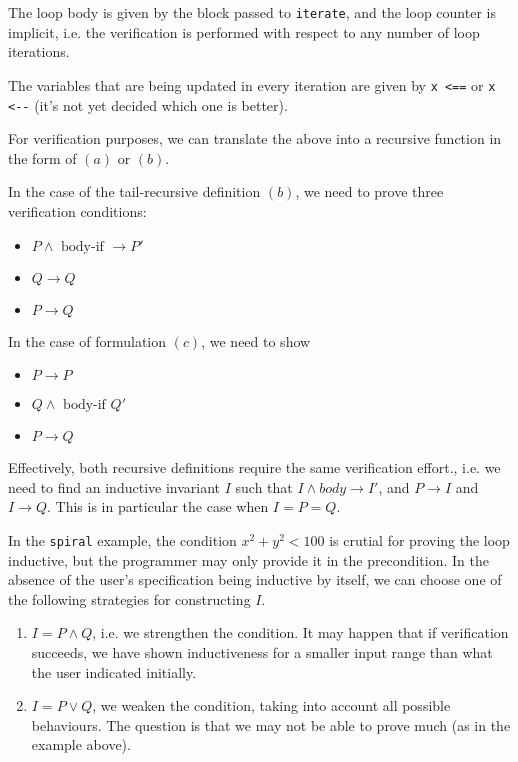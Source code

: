 The loop body is given by the block passed to \lstinline{iterate},
and the loop counter is implicit, i.e. the verification is performed
with respect to any number of loop iterations.

The variables that are being updated in every iteration are given by
\lstinline{x <==} or \lstinline{x <--} (it's not yet decided which one is better).

For verification purposes, we can translate the above into a recursive function
in the form of $(a)$ or $(b)$.

In the case of the tail-recursive definition $(b)$, we need to prove three verification
conditions:
\begin{itemize}
\item $P \wedge \text{ body-if } \to P'$

\item $Q \to Q$

\item $P \to Q$
\end{itemize}

In the case of formulation $(c)$, we need to show
\begin{itemize}
\item $P \to P$

\item $Q \wedge \text{ body-if } Q'$

\item $P \to Q$
\end{itemize}

Effectively, both recursive definitions require the same verification effort.,
i.e. we need to find an inductive invariant $I$ such that $I \wedge body \to I'$,
and $P \to I$ and $I \to Q$.
This is in particular the case when $I = P = Q$.

In the \lstinline{spiral} example, the condition $x^2 + y^2 < 100$ is crutial for proving
the loop inductive, but the programmer may only provide it in the precondition.
In the absence of the user's specification being inductive by itself,
we can choose one of the following strategies for constructing $I$.
\begin{enumerate}
\item $I = P \wedge Q$, i.e. we strengthen the condition. It may happen that if verification
succeeds, we have shown inductiveness for a smaller input range than what the user indicated initially.

\item $I = P \vee Q$, we weaken the condition, taking into account all possible behaviours.
The question is that we may not be able to prove much (as in the example above).
\end{enumerate}

